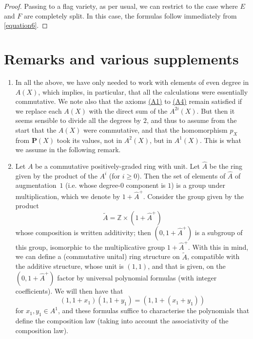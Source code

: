 \documentclass{article}
\theoremstyle{plain}
\theoremstyle{definition}
\newcommand{\PP}{\mathbf{P}}
\renewcommand{\geq}{\geqslant}
\newcommand{\oldpage}[1]{\marginpar{\footnotesize$\Big\vert$ \textit{p.~#1}}}
\begin{document}
\begin{proof}
  Passing to a flag variety, as per usual, we can restrict to the case where $E$ and $F$ are completely split.
  In this case, the formulas follow immediately from \cref{equation6}.
\end{proof}


\section{Remarks and various supplements}
\label{section4}

\begin{enumerate}
  \item\label{remark1}
    In all the above, we have only needed to work with elements of even degree in $A(X)$, which implies, in particular, that all the calculations were essentially commutative.
    We note also that the axioms \hyperref[axiomA1]{(A1)} to \hyperref[axiomA4]{(A4)} remain satisfied if we replace each $A(X)$ with the direct sum of the $A^{2i}(X)$.
    But then it seems sensible to divide all the degrees by $2$, and thus to assume from the start that the $A(X)$ were commutative, and that the homomorphism $p_X$ from $\PP(X)$ took its values, not in $A^2(X)$, but in $A^1(X)$.
    This is what we assume in the following remark.
  \item\label{remark2}
    Let $A$ be a commutative positively-graded ring with unit.
    Let $\widehat{A}$ be
\oldpage{148}
    the ring given by the product of the $A^i$ (for $i\geq0$).
    Then the set of elements of $\widehat{A}$ of augmentation~$1$ (i.e. whose degree-$0$ component is $1$) is a group under multiplication, which we denote by $1+\widehat{A}^+$.
    Consider the group given by the product
    \[
      \widetilde{A} = \mathbb{Z}\times(1+\widehat{A}^+)
    \]
    whose composition is written additivity;
    then $(0,1+\widehat{A}^+)$ is a subgroup of this group, isomorphic to the multiplicative group $1+\widehat{A}^+$.
    With this in mind, we can define a (commutative unital) ring structure on $\widetilde{A}$, compatible with the additive structure, whose unit is $(1,1)$, and that is given, on the $(0,1+\widehat{A}^+)$ factor by universal polynomial formulas (with integer coefficients).
    We will then have that
    \[
    \label{equation8}
      (1,1+x_1)(1,1+y_1) = (1,1+(x_1+y_1))
    \tag{8}
    \]
    for $x_1,y_1\in A^1$, and these formulas suffice to characterise the polynomials that define the composition law (taking into account the associativity of the composition law).


\end{enumerate}
\end{document}
